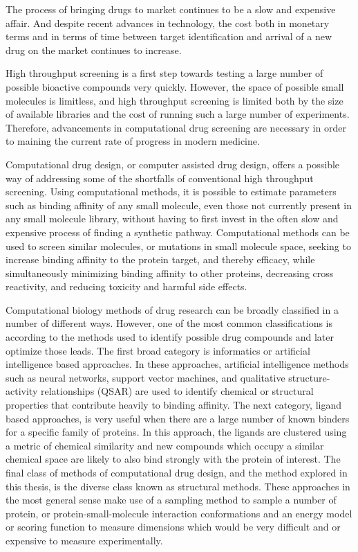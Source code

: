 The process of bringing drugs to market continues to be a slow and expensive affair.
And despite recent advances in technology, the cost both in monetary terms and in terms of time between target identification and arrival of a new drug on the market continues to increase.

High throughput screening is a first step towards testing a large number of possible bioactive compounds very quickly.
However, the space of possible small molecules is limitless, and high throughput screening is limited both by the size of available libraries and the cost of running such a large number of experiments.
Therefore, advancements in computational drug screening are necessary in order to maining the current rate of progress in modern medicine.

Computational drug design, or computer assisted drug design, offers a possible way of addressing some of the shortfalls of conventional high throughput screening.
Using computational methods, it is possible to estimate parameters such as binding affinity of any small molecule, even those not currently present in any small molecule library, without having to first invest in the often slow and expensive process of finding a synthetic pathway.
Computational methods can be used to screen similar molecules, or mutations in small molecule space, seeking to increase binding affinity to the protein target, and thereby efficacy, while simultaneously minimizing binding affinity to other proteins, decreasing cross reactivity, and reducing toxicity and harmful side effects.

Computational biology methods of drug research can be broadly classified in a number of different ways.
However, one of the most common classifications is according to the methods used to identify possible drug compounds and later optimize those leads.
The first broad category is informatics or artificial intelligence based approaches.
In these approaches, artificial intelligence methods such as neural networks, support vector machines, and qualitative structure-activity relationships (QSAR) are used to identify chemical or structural properties that contribute heavily to binding affinity.
The next category, ligand based approaches, is very useful when there are a large number of known binders for a specific family of proteins.
In this approach, the ligands are clustered using a metric of chemical similarity and new compounds which occupy a similar chemical space are likely to also bind strongly with the protein of interest.
The final class of methods of computational drug design, and the method explored in this thesis, is the diverse class known as structural methods.
These approaches in the most general sense make use of a sampling method to sample a number of protein, or protein-small-molecule interaction conformations and an energy model or scoring function to measure dimensions which would be very difficult and or expensive to measure experimentally.

